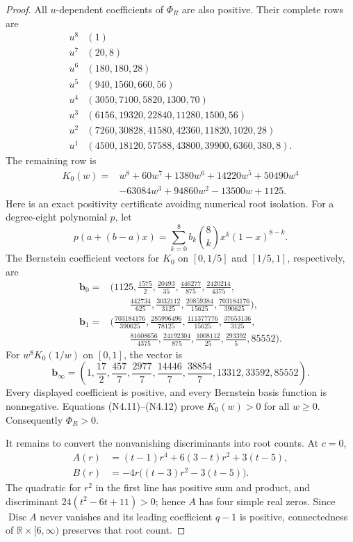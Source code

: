 \documentclass[11pt]{article}
\theoremstyle{definition}
\theoremstyle{remark}
\begin{document}
\begin{proof}
All \(u\)-dependent coefficients of \(\Phi_R\) are also positive.  Their
complete rows are
\[
\begin{array}{c|l}
u^8&(1)\\
u^7&(20,8)\\
u^6&(180,180,28)\\
u^5&(940,1560,660,56)\\
u^4&(3050,7100,5820,1300,70)\\
u^3&(6156,19320,22840,11280,1500,56)\\
u^2&(7260,30828,41580,42360,11820,1020,28)\\
u^1&(4500,18120,57588,43800,39900,6360,380,8).
\end{array}
\tag{N4.8}
\]
The remaining row is
\[
\begin{aligned}
 K_0(w)={}&w^8+60w^7+1380w^6+14220w^5+50490w^4\\
 &-63084w^3+94860w^2-13500w+1125.
\end{aligned}
\tag{N4.9}
\]
Here is an exact positivity certificate avoiding numerical root isolation.
For a degree-eight polynomial \(p\), let
\[
 p(a+(b-a)x)=\sum_{k=0}^8 b_k\binom8k x^k(1-x)^{8-k}.
 \tag{N4.10}
\]
The Bernstein coefficient vectors for \(K_0\) on
\([0,1/5]\) and \([1/5,1]\), respectively, are
\[
\begin{aligned}
{\boldsymbol b}_{0}={}&
\biggl(1125,\frac{1575}{2},\frac{20493}{35},\frac{446277}{875},
\frac{2420214}{4375},\\
&\qquad
\frac{442734}{625},\frac{3032112}{3125},
\frac{20859384}{15625},\frac{703184176}{390625}\biggr),\\
{\boldsymbol b}_{1}={}&
\biggl(\frac{703184176}{390625},\frac{285996496}{78125},
\frac{111377776}{15625},\frac{37653136}{3125},\\
&\qquad
\frac{81608656}{4375},\frac{24192304}{875},\frac{1008112}{25},
\frac{293392}{5},85552\biggr).
\end{aligned}
\tag{N4.11}
\]
For \(w^8K_0(1/w)\) on \([0,1]\), the vector is
\[
 {\boldsymbol b}_{\infty}=
 \left(1,\frac{17}{2},\frac{457}{7},\frac{2977}{7},
 \frac{14446}{7},\frac{38854}{7},13312,33592,85552\right).
 \tag{N4.12}
\]
Every displayed coefficient is positive, and every Bernstein basis function
is nonnegative.  Equations \textup{(N4.11)}--\textup{(N4.12)} prove
\(K_0(w)>0\) for all \(w\ge0\).  Consequently \(\Phi_R>0\).

It remains to convert the nonvanishing discriminants into root counts.  At
\(c=0\),
\[
\begin{aligned}
 A(r)&=(t-1)r^4+6(3-t)r^2+3(t-5),\\
 B(r)&=-4r\bigl((t-3)r^2-3(t-5)\bigr).
\end{aligned}
\tag{N4.13}
\]
The quadratic for \(r^2\) in the first line has positive sum and product,
and discriminant \(24(t^2-6t+11)>0\); hence \(A\) has four simple real
zeros.  Since \(\operatorname{Disc}A\) never vanishes and its leading
coefficient \(q-1\) is positive, connectedness of
\(\mathbb R\times[6,\infty)\) preserves that root count.


\end{proof}
\end{document}
